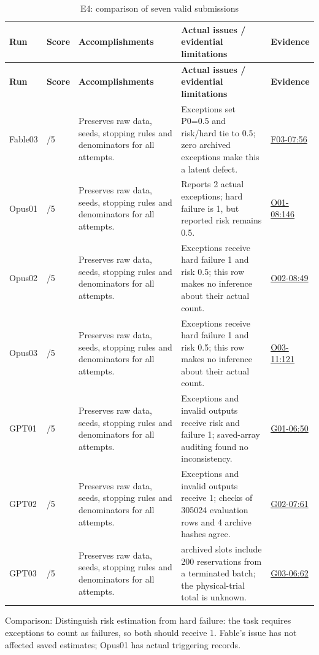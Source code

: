 \documentclass[11pt,a4paper]{article}
\begin{document}
{\fontsize{9.0}{12.6}\selectfont
\setlength{\tabcolsep}{2.5pt}
\begin{longtable}{>{\raggedright\arraybackslash}p{}>{\raggedright\arraybackslash}p{}>{\raggedright\arraybackslash}p{}>{\raggedright\arraybackslash}p{}>{\raggedright\arraybackslash}p{}}
\caption{E4: comparison of seven valid submissions}\\
\toprule
\textbf{Run} & \textbf{Score} & \textbf{Accomplishments} & \textbf{Actual issues /\allowbreak{} evidential limitations} & \textbf{Evidence}\tabularnewline
\midrule
\endfirsthead
\toprule
\textbf{Run} & \textbf{Score} & \textbf{Accomplishments} & \textbf{Actual issues /\allowbreak{} evidential limitations} & \textbf{Evidence}\tabularnewline
\midrule
\endhead
{}Fable03 & 4/\allowbreak{}5 & Preserves raw data,\allowbreak{} seeds,\allowbreak{} stopping rules and denominators for all attempts. & Exceptions set P0=0.5 and risk/\allowbreak{}hard tie to 0.5; zero archived exceptions make this a latent defect. & \hyperref[src:F03-07]{F03-07:56}\tabularnewline
{}Opus01 & 4.5/\allowbreak{}5 & Preserves raw data,\allowbreak{} seeds,\allowbreak{} stopping rules and denominators for all attempts. & Reports 2 actual exceptions; hard failure is 1,\allowbreak{} but reported risk remains 0.5. & \hyperref[src:O01-08]{O01-08:146}\tabularnewline
{}Opus02 & 4.5/\allowbreak{}5 & Preserves raw data,\allowbreak{} seeds,\allowbreak{} stopping rules and denominators for all attempts. & Exceptions receive hard failure 1 and risk 0.5; this row makes no inference about their actual count. & \hyperref[src:O02-08]{O02-08:49}\tabularnewline
{}Opus03 & 4.5/\allowbreak{}5 & Preserves raw data,\allowbreak{} seeds,\allowbreak{} stopping rules and denominators for all attempts. & Exceptions receive hard failure 1 and risk 0.5; this row makes no inference about their actual count. & \hyperref[src:O03-11]{O03-11:121}\tabularnewline
{}GPT01 & 5/\allowbreak{}5 & Preserves raw data,\allowbreak{} seeds,\allowbreak{} stopping rules and denominators for all attempts. & Exceptions and invalid outputs receive risk and failure 1; saved-array auditing found no inconsistency. & \hyperref[src:G01-06]{G01-06:50}\tabularnewline
{}GPT02 & 5/\allowbreak{}5 & Preserves raw data,\allowbreak{} seeds,\allowbreak{} stopping rules and denominators for all attempts. & Exceptions and invalid outputs receive 1; checks of 305024 evaluation rows and 4 archive hashes agree. & \hyperref[src:G02-07]{G02-07:61}\tabularnewline
{}GPT03 & 5/\allowbreak{}5 & Preserves raw data,\allowbreak{} seeds,\allowbreak{} stopping rules and denominators for all attempts. & 340600 archived slots include 200 reservations from a terminated batch; the physical-trial total is unknown. & \hyperref[src:G03-06]{G03-06:62}\tabularnewline
\bottomrule
\end{longtable}
}
Comparison: Distinguish risk estimation from hard failure: the task requires exceptions to count as failures,\allowbreak{} so both should receive 1. Fable's issue has not affected saved estimates; Opus01 has actual triggering records.
\end{document}
